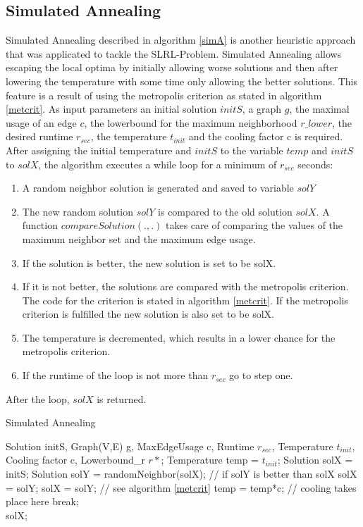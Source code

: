\documentclass [12pt]{article}
\begin{document}
\subsection{Simulated Annealing}
Simulated Annealing described in algorithm \ref{simA} is another heuristic approach that was applicated to tackle the SLRL-Problem. Simulated Annealing allows 
escaping the local optima by initially allowing worse solutions and then after lowering the temperature with some time only allowing the better solutions.
This feature is a result of using the metropolis criterion as stated in algorithm \ref{metcrit}.
As input parameters an initial solution $initS$, a graph $g$, the maximal usage of an edge $c$, the lowerbound for the maximum neighborhood $r\_lower$,
the desired runtime $r_{sec}$, the temperature $t_{init}$ and the cooling factor c is required.
After assigning the initial temperature and $initS$ to the variable $temp$ and $initS$ to $solX$,
the algorithm executes a while loop for a minimum of $r_{sec}$ seconds:
\begin{enumerate}
  \item {A random neighbor solution is generated and saved to variable $solY$}
  \item {The new random solution $solY$ is compared to the old solution $solX$. A function $compareSolution(.,.)$ takes care of 
    comparing the values of the maximum neighbor set and the maximum edge usage.}
  \item {If the solution is better, the new solution is set to be solX.}
  \item {If it is not better, the solutions are compared with the metropolis criterion. The code for the criterion is stated in algorithm \ref{metcrit}. If the metropolis criterion
    is fulfilled the new solution is also set to be solX. }
  \item {The temperature is decremented, which results in a lower chance for the metropolis criterion.}
  \item {If the runtime of the loop is not more than $r_{sec}$ go to step one.}
\end{enumerate}
After the loop, $solX$ is returned.


\begin {algorithm} [H]
\caption {Simulated Annealing}
\label {simA}
\begin {algorithmic} [3]
\Require Solution initS, Graph(V,E) g, MaxEdgeUsage c, Runtime $r_{sec}$, Temperature $t_{init}$, Cooling factor c,
Lowerbound\_r $r*$; 
\State Temperature temp = $t_{init}$;
\State Solution solX = initS; 
\State Solution solY = randomNeighbor(solX);
 // if solY is better than solX
\State solX = solY;
\Else
{}
\State solX = solY; // see algorithm \ref{metcrit}
\EndIf
\EndIf    
\State temp = temp*c; // cooling takes place here
\State break;
\EndIf 
\EndWhile\\
\Return solX;
\end {algorithmic}
\end {algorithm}
\end{document}
